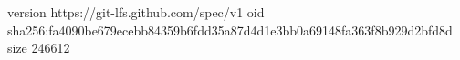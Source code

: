 version https://git-lfs.github.com/spec/v1
oid sha256:fa4090be679ecebb84359b6fdd35a87d4d1e3bb0a69148fa363f8b929d2bfd8d
size 246612
